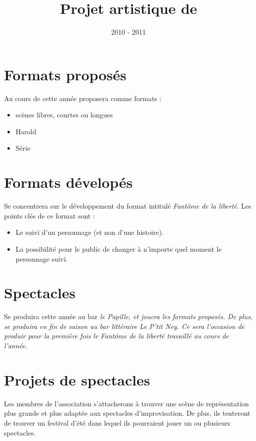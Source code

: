 \documentclass[a4paper,french,10pt]{article}
\title{Projet artistique de \meta{}}
\begin{document}
\date{2010 - 2011}

\maketitle 
\pagestyle{fancy} 


\section{Formats proposés}
Au cours de cette année \meta{} proposera comme formats :
\begin{itemize}
\item scènes libres, courtes ou longues
\item Harold
\item Série
\end{itemize}

\section{Formats dévelopés}
\meta{} Se concentrera sur le développement du format intitulé \textit{Fantôme de la liberté}.
Les points clés de ce format sont :
\begin{itemize}
\item Le suivi d'un personnage (et non d'une histoire).
\item La possibilité pour le public de changer à n'importe quel moment le personnage suivi.
\end{itemize}

\section{Spectacles}
\meta{}Se produira cette année au bar \em{le Papille}, et jouera les formats proposés. De plus, \meta{} se produira en fin de saison au bar littéraire \em{Le P'tit Ney}. Ce sera l'occasion de produir pour la première fois le \textit{Fantôme de la liberté} travaillé au cours de l'année.

\section{Projets de spectacles}
Les membres de l'association s'attacherons à trouver une scène de représentation plus grande et plus adaptée aux spectacles d'improvisation. De plus, ils tenteront de trouver un festival d'été dans lequel ils pourraient jouer un ou plusieurs spectacles.
\end{document}
